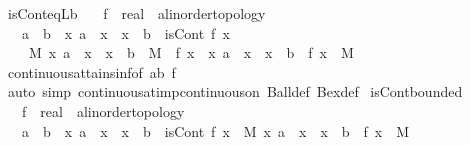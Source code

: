 \begin{isabellebody}
\endisatagproof
{\isafoldproof}%
%
\isadelimproof
\isanewline
%
\endisadelimproof
\isanewline
{}\isamarkupfalse%
\ isCont{\isacharunderscore}{\kern0pt}eq{\isacharunderscore}{\kern0pt}Lb{\isacharcolon}{\kern0pt}\isanewline
\ \ \ f\ {\isacharcolon}{\kern0pt}{\isacharcolon}{\kern0pt}\ {\isachardoublequoteopen}real\ {\isasymRightarrow}\ {\isacharprime}{\kern0pt}a{\isacharcolon}{\kern0pt}{\isacharcolon}{\kern0pt}linorder{\isacharunderscore}{\kern0pt}topology{\isachardoublequoteclose}\isanewline
\ \ \ {\isachardoublequoteopen}a\ {\isasymle}\ b\ {\isasymLongrightarrow}\ {\isasymforall}x{\isachardot}{\kern0pt}\ a\ {\isasymle}\ x\ {\isasymand}\ x\ {\isasymle}\ b\ {\isasymlongrightarrow}\ isCont\ f\ x\ {\isasymLongrightarrow}\isanewline
\ \ \ \ {\isasymexists}M{\isachardot}{\kern0pt}\ {\isacharparenleft}{\kern0pt}{\isasymforall}x{\isachardot}{\kern0pt}\ a\ {\isasymle}\ x\ {\isasymand}\ x\ {\isasymle}\ b\ {\isasymlongrightarrow}\ M\ {\isasymle}\ f\ x{\isacharparenright}{\kern0pt}\ {\isasymand}\ {\isacharparenleft}{\kern0pt}{\isasymexists}x{\isachardot}{\kern0pt}\ a\ {\isasymle}\ x\ {\isasymand}\ x\ {\isasymle}\ b\ {\isasymand}\ f\ x\ {\isacharequal}{\kern0pt}\ M{\isacharparenright}{\kern0pt}{\isachardoublequoteclose}\isanewline
%
\isadelimproof
\ \ %
\endisadelimproof
%
\isatagproof
{}\isamarkupfalse%
\ continuous{\isacharunderscore}{\kern0pt}attains{\isacharunderscore}{\kern0pt}inf{\isacharbrackleft}{\kern0pt}of\ {\isachardoublequoteopen}{\isacharbraceleft}{\kern0pt}a{\isachardot}{\kern0pt}{\isachardot}{\kern0pt}b{\isacharbraceright}{\kern0pt}{\isachardoublequoteclose}\ f{\isacharbrackright}{\kern0pt}\isanewline
\ \ \isamarkupfalse%
\ {\isacharparenleft}{\kern0pt}auto\ simp{\isacharcolon}{\kern0pt}\ continuous{\isacharunderscore}{\kern0pt}at{\isacharunderscore}{\kern0pt}imp{\isacharunderscore}{\kern0pt}continuous{\isacharunderscore}{\kern0pt}on\ Ball{\isacharunderscore}{\kern0pt}def\ Bex{\isacharunderscore}{\kern0pt}def{\isacharparenright}{\kern0pt}%
\endisatagproof
{\isafoldproof}%
%
\isadelimproof
\isanewline
%
\endisadelimproof
\isanewline
{}\isamarkupfalse%
\ isCont{\isacharunderscore}{\kern0pt}bounded{\isacharcolon}{\kern0pt}\isanewline
\ \ \ f\ {\isacharcolon}{\kern0pt}{\isacharcolon}{\kern0pt}\ {\isachardoublequoteopen}real\ {\isasymRightarrow}\ {\isacharprime}{\kern0pt}a{\isacharcolon}{\kern0pt}{\isacharcolon}{\kern0pt}linorder{\isacharunderscore}{\kern0pt}topology{\isachardoublequoteclose}\isanewline
\ \ \ {\isachardoublequoteopen}a\ {\isasymle}\ b\ {\isasymLongrightarrow}\ {\isasymforall}x{\isachardot}{\kern0pt}\ a\ {\isasymle}\ x\ {\isasymand}\ x\ {\isasymle}\ b\ {\isasymlongrightarrow}\ isCont\ f\ x\ {\isasymLongrightarrow}\ {\isasymexists}M{\isachardot}{\kern0pt}\ {\isasymforall}x{\isachardot}{\kern0pt}\ a\ {\isasymle}\ x\ {\isasymand}\ x\ {\isasymle}\ b\ {\isasymlongrightarrow}\ f\ x\ {\isasymle}\ M{\isachardoublequoteclose}\isanewline

\end{isabellebody}
